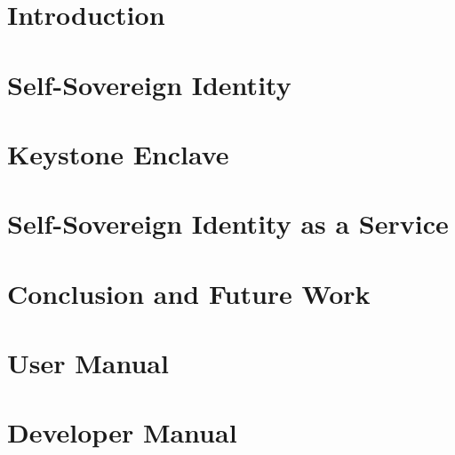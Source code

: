 \documentclass[pdfa%
,twoside%
,12pt%
]{toptesi}
\begin{document}
\indici

\mainmatter

\chapter{Introduction}
\label{chap:Intro}


\chapter{Self-Sovereign Identity}
\label{chap:SSI}


\chapter{Keystone Enclave}
\label{chap:Keystone}


\chapter{Self-Sovereign Identity as a Service}
\label{chap:SSIaaS}


\chapter{Conclusion and Future Work}
\label{chap:Conclusion}



\appendix
\chapter{User Manual}

\chapter{Developer Manual}


%



\end{document}
